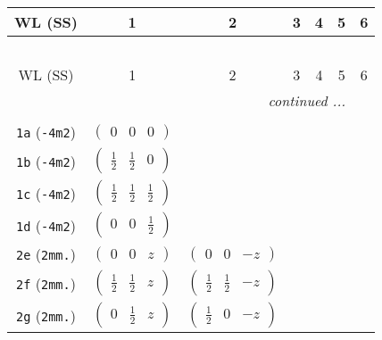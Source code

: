 \documentclass[fleqn,9pt,landscape]{jsarticle}
\begin{document}
\begin{center}
\renewcommand{\arraystretch}{1.2}
\begin{longtable}{ccccccc}
 \hline \hline
WL (SS) & 1 & 2 & 3 & 4 & 5 & 6 \\ \hline \endfirsthead

\multicolumn{6}{l}{\tablename\ \thetable{}} \\
 \hline \hline
WL (SS) & 1 & 2 & 3 & 4 & 5 & 6 \\ \hline \endhead

 \hline \hline
\multicolumn{6}{r}{\footnotesize\it continued ...} \\ \endfoot

 \hline \hline
\multicolumn{6}{r}{} \\ \endlastfoot

{\tt 1a} ({\tt -4m2}) & $ \begin{pmatrix} 0 & 0 & 0 \end{pmatrix} $ & $  $ & $  $ & $  $ & $  $ & $  $ \\ \hline
{\tt 1b} ({\tt -4m2}) & $ \begin{pmatrix} \frac{1}{2} & \frac{1}{2} & 0 \end{pmatrix} $ & $  $ & $  $ & $  $ & $  $ & $  $ \\ \hline
{\tt 1c} ({\tt -4m2}) & $ \begin{pmatrix} \frac{1}{2} & \frac{1}{2} & \frac{1}{2} \end{pmatrix} $ & $  $ & $  $ & $  $ & $  $ & $  $ \\ \hline
{\tt 1d} ({\tt -4m2}) & $ \begin{pmatrix} 0 & 0 & \frac{1}{2} \end{pmatrix} $ & $  $ & $  $ & $  $ & $  $ & $  $ \\ \hline
{\tt 2e} ({\tt 2mm.}) & $ \begin{pmatrix} 0 & 0 & z \end{pmatrix} $ & $ \begin{pmatrix} 0 & 0 & - z \end{pmatrix} $ & $  $ & $  $ & $  $ & $  $ \\ \hline
{\tt 2f} ({\tt 2mm.}) & $ \begin{pmatrix} \frac{1}{2} & \frac{1}{2} & z \end{pmatrix} $ & $ \begin{pmatrix} \frac{1}{2} & \frac{1}{2} & - z \end{pmatrix} $ & $  $ & $  $ & $  $ & $  $ \\ \hline
{\tt 2g} ({\tt 2mm.}) & $ \begin{pmatrix} 0 & \frac{1}{2} & z \end{pmatrix} $ & $ \begin{pmatrix} \frac{1}{2} & 0 & - z \end{pmatrix} $ & $  $ & $  $ & $  $ & $  $ \\ \hline

\end{longtable}
\end{center}
\end{document}
